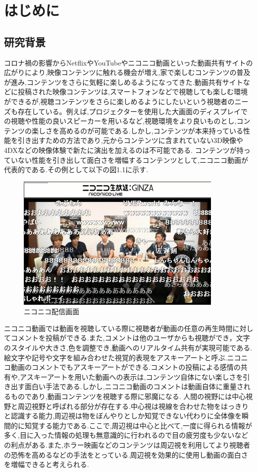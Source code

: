 \chapter{はじめに}
\thispagestyle{myheadings}

\section{研究背景}
コロナ禍の影響からNetflixやYouTubeやニコニコ動画といった動画共有サイトの広がりにより,映像コンテンツに触れる機会が増え,家で楽しむコンテンツの普及が進み,コンテンツをさらに気軽に楽しめるようになってきた.動画共有サイトなどに投稿された映像コンテンツは,スマートフォンなどで視聴しても楽しむ環境ができるが,視聴コンテンツをさらに楽しめるようにしたいという視聴者のニーズも存在している。例えば,プロジェクターを使用した大画面のディスプレイでの視聴や性能の良いスピーカーを用いるなど,視聴環境をより良いものとし,コンテンツの楽しさを高めるのが可能である.しかし,コンテンツが本来持っている性能を引き出すための方法であり,元からコンテンツに含まれていない3D映像や4DXなどの映像体験で新たに演出を加えるのは不可能である.
コンテンツが持っていない性能を引き出して面白さを増幅するコンテンツとして,ニコニコ動画が代表的である.その例として以下の図1.1に示す.
\begin{figure}[H]
    \centering
    \includegraphics[width=10cm]{images/chapter1/nikoniko.jpeg}
    \caption{ニコニコ配信画面}
    \label{abst}
\end{figure}
ニコニコ動画では動画を視聴している際に視聴者が動画の任意の再生時間に対してコメントを投稿ができる.また,コメントは他のユーザからも視聴ができ，文字のスタイルや大きさ,色を調整でき,動画へのリアルタイム共有が実現可能である.絵文字や記号や文字を組み合わせた視覚的表現をアスキーアートと呼ぶ.ニコニコ動画のコメントでもアスキーアートができる.コメントの投稿による感情の共有や,アスキーアートを用いた動画への表示は,コンテンツ自体にない楽しさを引き出す面白い手法である.しかし,ニコニコ動画のコメントは動画自体に重量されるものであり,動画コンテンツを視聴する際に邪魔になる.
人間の視野には中心視野と周辺視野と呼ばれる部分が存在する.中心視は視線を合わせた物をはっきりと認識する能力,周辺視は物をぼんやりとしか知覚できない代わりに全体像を瞬間的に知覚する能力である.ここで,周辺視は中心と比べて,一度に得られる情報が多く,目に入った情報の処理も無意識的に行われるので目の疲労度も少ないなどの利点がある.また,ホラー映画などのコンテンツは周辺視を利用してより視聴者の恐怖を高めるなどの手法をとっている.周辺視を効果的に使用し動画の面白さを増幅できると考えられる.



